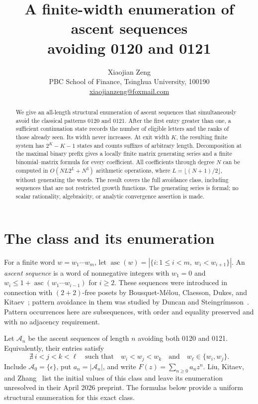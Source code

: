 \documentclass[11pt]{article}
\title{A finite-width enumeration of ascent sequences\\avoiding 0120 and 0121}
\author{Xiaojian Zeng\\
  \small PBC School of Finance, Tsinghua University, 100190\\
  \small\href{mailto:xiaojianzeng@foxmail.com}{xiaojianzeng@foxmail.com}}
\date{}
\theoremstyle{remark}
\DeclareMathOperator{\asc}{asc}
\newcommand{\A}{\mathcal A}
\begin{document}
\maketitle

\begin{abstract}
We give an all-length structural enumeration of ascent sequences that
simultaneously avoid the classical patterns 0120 and 0121. After the first
entry greater than one, a sufficient continuation state records the number
of eligible letters and the ranks of those already seen. Its width never
increases. At exit width $K$, the resulting finite system has
$2^K-K-1$ states and counts suffixes of arbitrary length. Decomposition at
the maximal binary prefix gives a locally finite matrix generating series
and a finite binomial--matrix formula for every coefficient. All
coefficients through degree $N$ can be computed in
$O(NL2^L+N^3)$ arithmetic operations, where
$L=\lfloor(N+1)/2\rfloor$, without generating the words. The result covers
the full avoidance class, including sequences that are not restricted
growth functions. The generating series is formal; no scalar rationality,
algebraicity, or analytic convergence assertion is made.
\end{abstract}

\section{The class and its enumeration}

For a finite word $w=w_1\cdots w_m$, let
$\asc(w)=|\{i:1\leq i<m,\ w_i<w_{i+1}\}|$.
An \emph{ascent sequence} is a word of nonnegative integers with $w_1=0$
and $w_i\leq 1+\asc(w_1\cdots w_{i-1})$ for $i\geq2$.
These sequences were introduced in connection with $(2+2)$-free posets
by Bousquet-M\'elou, Claesson, Dukes, and Kitaev~\cite{BMC2010};
pattern avoidance in them was studied by Duncan and
Steingr\'imsson~\cite{DS2011}.
Pattern occurrences here are subsequences, with order and equality
preserved and with no adjacency requirement.

Let $\A_n$ be the ascent sequences of length $n$ avoiding both 0120 and
0121. Equivalently, their entries satisfy
\begin{equation}\label{eq:avoid}
 \nexists\ i<j<k<\ell
 \quad\text{such that}\quad
 w_i<w_j<w_k\quad\text{and}\quad w_\ell\in\{w_i,w_j\}.
\end{equation}
Include $\A_0=\{\epsilon\}$, put $a_n=|\A_n|$, and write
$F(z)=\sum_{n\geq0}a_nz^n$.
Liu, Kitaev, and Zhang~\cite[Table~1 and Section~6]{LKZ2026}
list the initial values of this class and leave its enumeration
unresolved in their April 2026 preprint. The formulas below provide a
uniform structural enumeration for this exact class.
\end{document}
